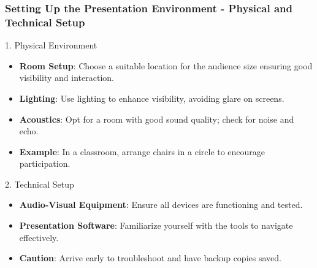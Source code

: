 \documentclass[aspectratio=169]{beamer}
\begin{document}
\begin{frame}[fragile]
    \frametitle{Setting Up the Presentation Environment - Physical and Technical Setup}
    \begin{block}{1. Physical Environment}
        \begin{itemize}
            \item \textbf{Room Setup}: Choose a suitable location for the audience size ensuring good visibility and interaction.
            \item \textbf{Lighting}: Use lighting to enhance visibility, avoiding glare on screens.
            \item \textbf{Acoustics}: Opt for a room with good sound quality; check for noise and echo.
            \item \textbf{Example}: In a classroom, arrange chairs in a circle to encourage participation.
        \end{itemize}
    \end{block}

    \begin{block}{2. Technical Setup}
        \begin{itemize}
            \item \textbf{Audio-Visual Equipment}: Ensure all devices are functioning and tested.
            \item \textbf{Presentation Software}: Familiarize yourself with the tools to navigate effectively.
            \item \textbf{Caution}: Arrive early to troubleshoot and have backup copies saved.
        \end{itemize}
    \end{block}
\end{frame}
\end{document}
